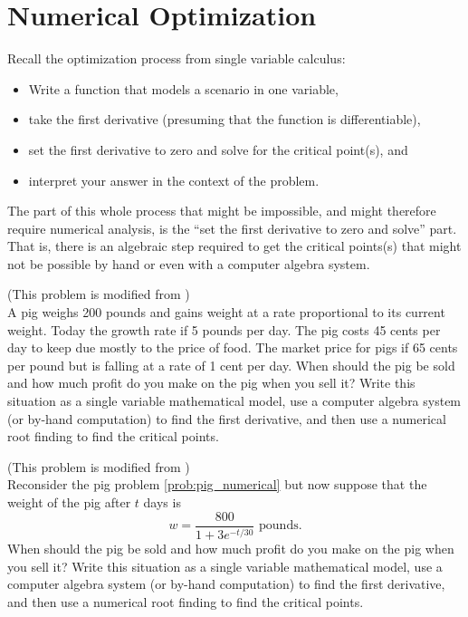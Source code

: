 \newpage\section{Numerical Optimization}
Recall the optimization process from single variable calculus:
\begin{itemize}
    \item Write a function that models a scenario in one variable,
    \item take the first derivative (presuming that the function is differentiable),
    \item set the first derivative to zero and solve for the critical point(s), and
    \item interpret your answer in the context of the problem.
\end{itemize}
The part of this whole process that might be impossible, and might therefore require
numerical analysis, is the ``set the first derivative to zero and solve'' part.  That is,
there is an algebraic step required to get the critical points(s) that might not be
possible by hand or even with a computer algebra system.    

\begin{problem}\label{prob:pig_numerical}
    (This problem is modified from \cite{Meerschaert}) \\
    A pig weighs 200 pounds and gains weight at a rate proportional to its current weight.
    Today the growth rate if 5 pounds per day.  The pig costs 45 cents per day to keep due
    mostly to the price of food.  The market price for pigs if 65 cents per pound but is
    falling at a rate of 1 cent per day.  When should the pig be sold and how much profit
    do you make on the pig when you sell it?  Write this situation as a single variable
    mathematical model, use a computer algebra system (or by-hand computation) to find the
    first derivative, and then use a numerical root finding to find the critical points.
\end{problem}

\begin{problem}
    (This problem is modified from \cite{Meerschaert}) \\
    Reconsider the pig problem \ref{prob:pig_numerical} but now suppose that the weight of
    the pig after $t$ days is 
    \[ w = \frac{800}{1+3e^{-t/30}} \text{ pounds}. \]
    When should the pig be sold and how much profit do you make on the pig when you sell
    it?  Write this situation as a single variable mathematical model, use a computer
    algebra system (or by-hand computation) to find the first derivative, and then use a
    numerical root finding to find the critical points.
\end{problem}

